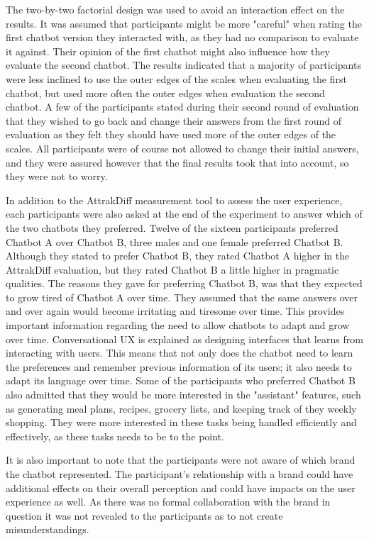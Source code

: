 The two-by-two factorial design was used to avoid an interaction effect on the results. It was assumed that participants might be more "careful" when rating the first chatbot version they interacted with, as they had no comparison to evaluate it against. Their opinion of the first chatbot might also influence how they evaluate the second chatbot. The results indicated that a majority of participants were less inclined to use the outer edges of the scales when evaluating the first chatbot, but used more often the outer edges when evaluation the second chatbot. A few of the participants stated during their second round of evaluation that they wished to go back and change their answers from the first round of evaluation as they felt they should have used more of the outer edges of the scales. All participants were of course not allowed to change their initial answers, and they were assured however that the final results took that into account, so they were not to worry. 

In addition to the AttrakDiff measurement tool to assess the user experience, each participants were also asked at the end of the experiment to answer which of the two chatbots they preferred. Twelve of the sixteen participants preferred Chatbot A over Chatbot B, three males and one female preferred Chatbot B. Although they stated to prefer Chatbot B, they rated Chatbot A higher in the AttrakDiff evaluation, but they rated Chatbot B a little higher in pragmatic qualities. The reasons they gave for preferring Chatbot B, was that they expected to grow tired of Chatbot A over time. They assumed that the same answers over and over again would become irritating and tiresome over time. This provides important information regarding the need to allow chatbots to adapt and grow over time. Conversational UX is explained as designing interfaces that learns from interacting with users. This means that not only does the chatbot need to learn the preferences and remember previous information of its users; it also needs to adapt its language over time. Some of the participants who preferred Chatbot B also admitted that they would be more interested in the "assistant" features, such as generating meal plans, recipes, grocery lists, and keeping track of they weekly shopping. They were more interested in these tasks being handled efficiently and effectively, as these tasks needs to be to the point. 

It is also important to note that the participants were not aware of which brand the chatbot represented. The participant's relationship with a brand could have additional effects on their overall perception and could have impacts on the user experience as well. As there was no formal collaboration with the brand in question it was not revealed to the participants as to not create misunderstandings.


